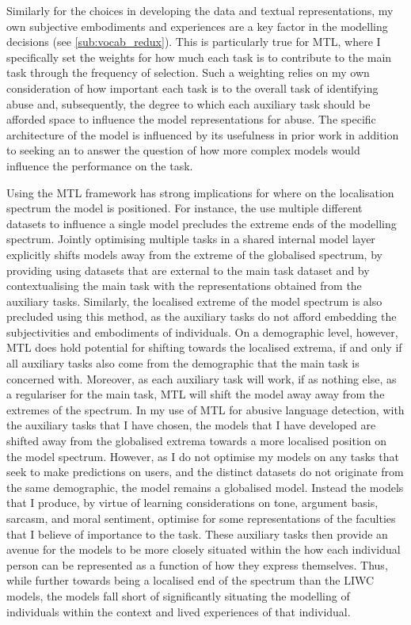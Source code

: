 {Similarly for the choices in developing the data and textual representations, my own subjective embodiments and experiences are a key factor in the modelling decisions (see \cref{sub:vocab_redux}).
This is particularly true for MTL, where I specifically set the weights for how much each task is to contribute to the main task through the frequency of selection.
Such a weighting relies on my own consideration of how important each task is to the overall task of identifying abuse and, subsequently, the degree to which each auxiliary task should be afforded space to influence the model representations for abuse.
The specific architecture of the model is influenced by its usefulness in prior work \citep{Bingel:2018} in addition to seeking an to answer the question of how more complex models would influence the performance on the task.

Using the MTL framework has strong implications for where on the localisation spectrum the model is positioned.
For instance, the use multiple different datasets to influence a single model precludes the extreme ends of the modelling spectrum.
Jointly optimising multiple tasks in a shared internal model layer explicitly shifts models away from the extreme of the globalised spectrum, by providing using datasets that are external to the main task dataset and by contextualising the main task with the representations obtained from the auxiliary tasks.
Similarly, the localised extreme of the model spectrum is also precluded using this method, as the auxiliary tasks do not afford embedding the subjectivities and embodiments of individuals.
On a demographic level, however, MTL does hold potential for shifting towards the localised extrema, if and only if all auxiliary tasks also come from the demographic that the main task is concerned with.
Moreover, as each auxiliary task will work, if as nothing else, as a regulariser for the main task, MTL will shift the model away away from the extremes of the spectrum.
In my use of MTL for abusive language detection, with the auxiliary tasks that I have chosen, the models that I have developed are shifted away from the globalised extrema towards a more localised position on the model spectrum.
However, as I do not optimise my models on any tasks that seek to make predictions on users, and the distinct datasets do not originate from the same demographic, the model remains a globalised model.
Instead the models that I produce, by virtue of learning considerations on tone, argument basis, sarcasm, and moral sentiment, optimise for some representations of the faculties that I believe of importance to the task.
These auxiliary tasks then provide an avenue for the models to be more closely situated within the how each individual person can be represented as a function of how they express themselves.
Thus, while further towards being a localised end of the spectrum than the LIWC models, the models fall short of significantly situating the modelling of individuals within the context and lived experiences of that individual.

}
